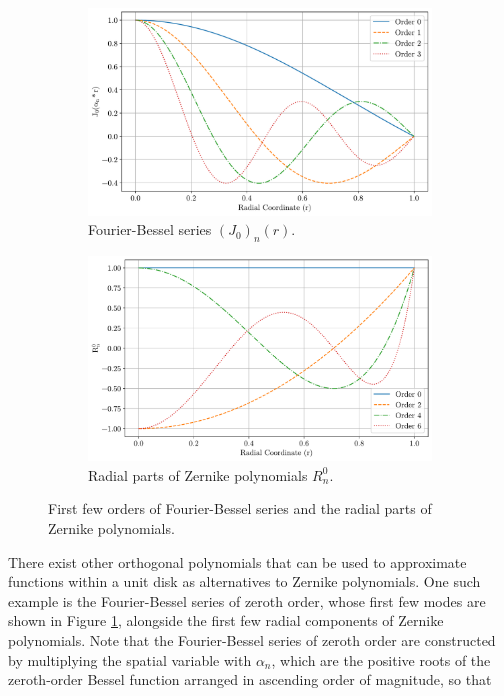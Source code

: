 \begin{figure}
    \centering
    \begin{subfigure}[b]{0.48\textwidth}
        \centering
        \includegraphics[width=\textwidth]{figs/bessel_exp.pdf}
        \caption{Fourier-Bessel series $(J_0)_n(r)$.}
    \end{subfigure}
    \hspace{1em}
    \begin{subfigure}[b]{0.48\textwidth}
        \centering
        \includegraphics[width=\textwidth]{figs/zernike_exp.pdf}
        \caption{Radial parts of Zernike polynomials $R^0_n$.}
    \end{subfigure}
    \caption{First few orders of Fourier-Bessel series and the radial parts of Zernike polynomials.}
    \label{fig_x}
\end{figure}

There exist other orthogonal polynomials that can be used to approximate functions within a unit disk as alternatives to Zernike polynomials. One such example is the Fourier-Bessel series of zeroth order, whose first few modes are shown in Figure \ref{fig_x}, alongside the first few radial components of Zernike polynomials. Note that the Fourier-Bessel series of zeroth order are constructed by multiplying the spatial variable with $\alpha_n$, which are the positive roots of the zeroth-order Bessel function arranged in ascending order of mag­nitude, so that


